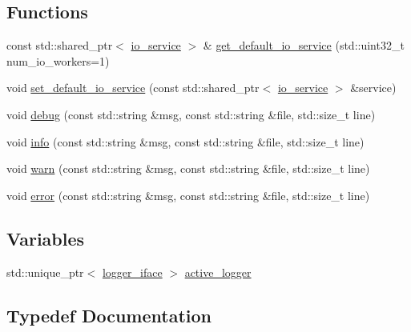 \subsection*{Functions}
\begin{DoxyCompactItemize}
\item 
const std\+::shared\+\_\+ptr$<$ \hyperlink{classtacopie_1_1io__service}{io\+\_\+service} $>$ \& \hyperlink{namespacetacopie_a08584acd5790cf1f3c9af96e5a8494a6}{get\+\_\+default\+\_\+io\+\_\+service} (std\+::uint32\+\_\+t num\+\_\+io\+\_\+workers=1)
\item 
void \hyperlink{namespacetacopie_a095c1c9a985cf34379d1fea9c030d2b9}{set\+\_\+default\+\_\+io\+\_\+service} (const std\+::shared\+\_\+ptr$<$ \hyperlink{classtacopie_1_1io__service}{io\+\_\+service} $>$ \&service)
\item 
void \hyperlink{namespacetacopie_a0833874b07ad56b5ba2c7847f1e514b0}{debug} (const std\+::string \&msg, const std\+::string \&file, std\+::size\+\_\+t line)
\item 
void \hyperlink{namespacetacopie_acaa581a9e021e4ca6a20270667ce4e21}{info} (const std\+::string \&msg, const std\+::string \&file, std\+::size\+\_\+t line)
\item 
void \hyperlink{namespacetacopie_ac0a2f06f2f9fb6ded97b659d8573c25d}{warn} (const std\+::string \&msg, const std\+::string \&file, std\+::size\+\_\+t line)
\item 
void \hyperlink{namespacetacopie_a48f7b277b1559f2333c1186fa629ef01}{error} (const std\+::string \&msg, const std\+::string \&file, std\+::size\+\_\+t line)
\end{DoxyCompactItemize}
\subsection*{Variables}
\begin{DoxyCompactItemize}
\item 
std\+::unique\+\_\+ptr$<$ \hyperlink{classtacopie_1_1logger__iface}{logger\+\_\+iface} $>$ \hyperlink{namespacetacopie_a043624ac998613a9387aca78a7f39f41}{active\+\_\+logger}
\end{DoxyCompactItemize}


\subsection{Typedef Documentation}
\mbox{\label{namespacetacopie_acce7ad26b2d30156b1e6fa353f727026}} 
